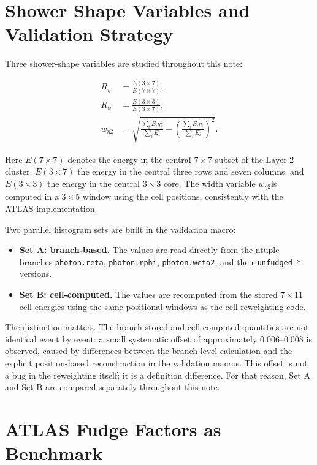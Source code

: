 \documentclass[11pt,a4paper]{article}
\newcommand{\Reta}{\ensuremath{R_{\eta}}}
\newcommand{\Rphi}{\ensuremath{R_{\phi}}}
\newcommand{\weta}{\ensuremath{w_{\eta 2}}}
\begin{document}
\section{Shower Shape Variables and Validation Strategy}

Three shower-shape variables are studied throughout this note:

\begin{align}
  \Reta &= \frac{E(3 \times 7)}{E(7 \times 7)}, \\
  \Rphi &= \frac{E(3 \times 3)}{E(3 \times 7)}, \\
  \weta &= \sqrt{\frac{\sum_i E_i \eta_i^2}{\sum_i E_i} -
                   \left(\frac{\sum_i E_i \eta_i}{\sum_i E_i}\right)^2}.
\end{align}

Here $E(7 \times 7)$ denotes the energy in the central $7 \times 7$ subset of
the Layer-2 cluster, $E(3 \times 7)$ the energy in the central three rows and
seven columns, and $E(3 \times 3)$ the energy in the central $3 \times 3$
core. The width variable \weta is computed in a $3 \times 5$ window using the
cell positions, consistently with the ATLAS implementation.

Two parallel histogram sets are built in the validation macro:

\begin{itemize}
  \item \textbf{Set A: branch-based.} The values are read directly from the
  ntuple branches \texttt{photon.reta}, \texttt{photon.rphi},
  \texttt{photon.weta2}, and their \texttt{unfudged\_*} versions.
  \item \textbf{Set B: cell-computed.} The values are recomputed from the
  stored $7 \times 11$ cell energies using the same positional windows as the
  cell-reweighting code.
\end{itemize}

The distinction matters. The branch-stored and cell-computed quantities are not
identical event by event: a small systematic offset of approximately
$0.006$--$0.008$ is observed, caused by differences between the branch-level
calculation and the explicit position-based reconstruction in the validation
macros. This offset is not a bug in the reweighting itself; it is a definition
difference. For that reason, Set A and Set B are compared separately throughout
this note.

\section{ATLAS Fudge Factors as Benchmark}
\end{document}
